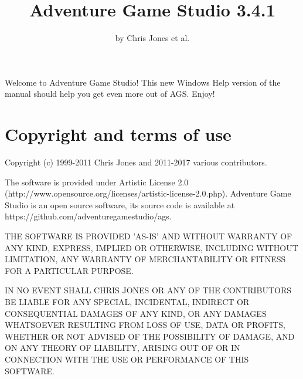 %
%
\newcommand{\commandref}[2]{\helpref{{\tt $\backslash$#1}}{#2}}%
\newcommand{\commandrefn}[2]{\helprefn{{\tt $\backslash$#1}}{#2}\index{#1}}%
\newcommand{\commandpageref}[2]{\latexignore{\helprefn{{\tt $\backslash$#1}}{#2}}\latexonly{{\tt $\backslash$#1} {\it page \pageref{#2}}}\index{#1}}%
\newcommand{\indexit}[1]{#1\index{#1}}%
\newcommand{\inioption}[1]{{\bf {\tt #1}}\index{#1}}%
\parskip=10pt%
\parindent=0pt%
\title{Adventure Game Studio 3.4.1}%
\author{by Chris Jones et al.}%
\makeindex%
%

\maketitle%
\pagestyle{fancyplain}%
%
%
%
\setfooter{\thepage}{}{}{}{}{\thepage}%

Welcome to Adventure Game Studio! This new Windows Help version of the manual should
help you get even more out of AGS. Enjoy!

\tableofcontents%

\chapter*{Copyright and terms of use}%
%
\setfooter{\thepage}{}{}{}{}{\thepage}%

Copyright (c) 1999-2011 Chris Jones and 2011-2017 various contributors.

The software is provided under Artistic License 2.0 (http://www.opensource.org/licenses/artistic-license-2.0.php).
Adventure Game Studio is an open source software, its source code is available at https://github.com/adventuregamestudio/ags.

THE SOFTWARE IS PROVIDED 'AS-IS' AND WITHOUT WARRANTY OF ANY KIND, EXPRESS,
IMPLIED OR OTHERWISE, INCLUDING WITHOUT LIMITATION, ANY WARRANTY OF
MERCHANTABILITY OR FITNESS FOR A PARTICULAR PURPOSE.

IN NO EVENT SHALL CHRIS JONES OR ANY OF THE CONTRIBUTORS BE LIABLE FOR ANY
SPECIAL, INCIDENTAL, INDIRECT OR CONSEQUENTIAL DAMAGES OF ANY KIND, OR ANY
DAMAGES WHATSOEVER RESULTING FROM LOSS OF USE, DATA OR PROFITS, WHETHER OR
NOT ADVISED OF THE POSSIBILITY OF DAMAGE, AND ON ANY THEORY OF LIABILITY,
ARISING OUT OF OR IN CONNECTION WITH THE USE OR PERFORMANCE OF THIS SOFTWARE.

